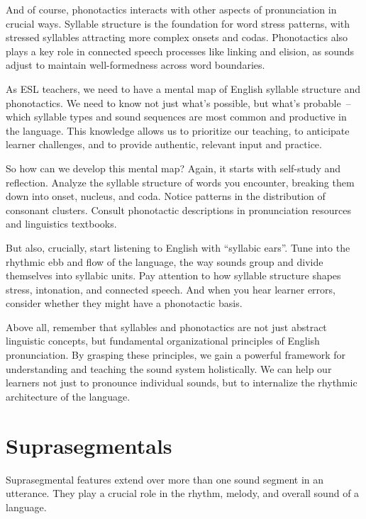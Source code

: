 And of course, phonotactics interacts with other aspects of pronunciation in crucial ways. Syllable structure is the foundation for word stress patterns, with stressed syllables attracting more complex onsets and codas. Phonotactics also plays a key role in connected speech processes like linking and elision, as sounds adjust to maintain well-formedness across word boundaries.

As ESL teachers, we need to have a mental map of English syllable structure and phonotactics. We need to know not just what's possible, but what's probable~-- which syllable types and sound sequences are most common and productive in the language. This knowledge allows us to prioritize our teaching, to anticipate learner challenges, and to provide authentic, relevant input and practice.

So how can we develop this mental map? Again, it starts with self-study and reflection. Analyze the syllable structure of words you encounter, breaking them down into onset, nucleus, and coda. Notice patterns in the distribution of consonant clusters. Consult phonotactic descriptions in pronunciation resources and linguistics textbooks.

But also, crucially, start listening to English with ``syllabic ears''. Tune into the rhythmic ebb and flow of the language, the way sounds group and divide themselves into syllabic units. Pay attention to how syllable structure shapes stress, intonation, and connected speech. And when you hear learner errors, consider whether they might have a phonotactic basis.

Above all, remember that syllables and phonotactics are not just abstract linguistic concepts, but fundamental organizational principles of English pronunciation. By grasping these principles, we gain a powerful framework for understanding and teaching the sound system holistically. We can help our learners not just to pronounce individual sounds, but to internalize the rhythmic architecture of the language.

\section{Suprasegmentals}

Suprasegmental features extend over more than one sound segment in an utterance. They play a crucial role in the rhythm, melody, and overall sound of a language.

